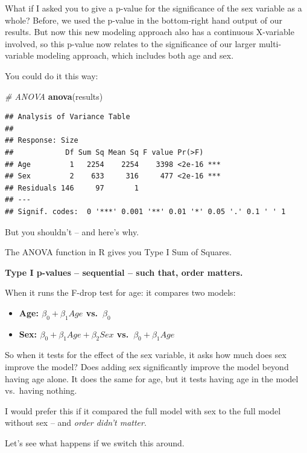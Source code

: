 \documentclass[
]{article}
\newenvironment{Shaded}{\begin{snugshade}}{\end{snugshade}}
\newcommand{\CommentTok}[1]{\textcolor[rgb]{0.56,0.35,0.01}{\textit{#1}}}
\newcommand{\FunctionTok}[1]{\textcolor[rgb]{0.13,0.29,0.53}{\textbf{#1}}}
\newcommand{\NormalTok}[1]{#1}
\providecommand{\tightlist}{%
  \setlength{\itemsep}{0pt}\setlength{\parskip}{0pt}}
\begin{document}
What if I asked you to give a p-value for the significance of the sex
variable as a whole? Before, we used the p-value in the bottom-right
hand output of our results. But now this new modeling approach also has
a continuous X-variable involved, so this p-value now relates to the
significance of our larger multi-variable modeling approach, which
includes both age and sex.

You could do it this way:

\begin{Shaded}
\begin{Highlighting}[]
\CommentTok{\# ANOVA}
\FunctionTok{anova}\NormalTok{(results)}
\end{Highlighting}
\end{Shaded}

\begin{verbatim}
## Analysis of Variance Table
## 
## Response: Size
##            Df Sum Sq Mean Sq F value Pr(>F)    
## Age         1   2254    2254    3398 <2e-16 ***
## Sex         2    633     316     477 <2e-16 ***
## Residuals 146     97       1                   
## ---
## Signif. codes:  0 '***' 0.001 '**' 0.01 '*' 0.05 '.' 0.1 ' ' 1
\end{verbatim}

But you shouldn't -- and here's why.

The ANOVA function in R gives you Type I Sum of Squares.

\textbf{Type I p-values -- sequential -- such that, order matters.}

When it runs the F-drop test for age: it compares two models:

\begin{itemize}
\tightlist
\item
  \textbf{Age: \(\beta_0 + \beta_1 Age\) vs.~\(\beta_0\)}
\item
  \textbf{Sex: \(\beta_0 + \beta_1 Age + \beta_2 Sex\)
  vs.~\(\beta_0 + \beta_1 Age\)}
\end{itemize}

So when it tests for the effect of the sex variable, it asks how much
does sex improve the model? Does adding sex significantly improve the
model beyond having age alone. It does the same for age, but it tests
having age in the model vs.~having nothing.

I would prefer this if it compared the full model with sex to the full
model without sex -- and \emph{order didn't matter}.

Let's see what happens if we switch this around.
\end{document}
